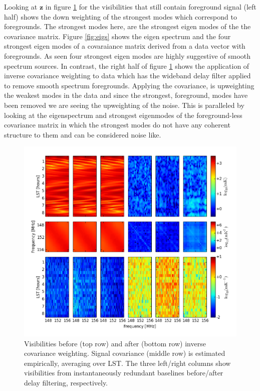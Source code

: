 \documentclass[twocolumn,numberedappendix]{emulateapj} \shorttitle{PSA64}
\begin{document}
Looking at $\mathbf{z}$ in figure \ref{fig:inv_cov} for the visibilities that
still contain foreground signal (left half) shows the down weighting of
the strongest modes which correspond to foregrounds. The strongest modes here,
are the strongest eigen modes of the the covariance matrix. Figure
\ref{fig:eigs} shows the eigen spectrum and the four strongest eigen modes of a
covaraiance matrix derived from a data vector with foregrounds. As seen four
strongest eigen modes are highly suggestive of smooth spectrum sources. In
contrast, the right half of figure \ref{fig:inv_cov} shows the application of
inverse covariance weighting to data which has the wideband delay filter applied
to remove smooth spectrum foregrounds. Applying the covariance, is upweighting
the weakest modes in the data and since the strongest, foreground, modes have
been removed we are seeing the upweighting of the noise. This is paralleled by
looking at the eigenspectrum and strongest eigenmodes of the foreground-less
covariance matrix in which the strongest modes do not have any coherent
structure to them and can be considered noise like.


\begin{figure}[h!]\centering
\includegraphics[width=2\columnwidth]{plots/inv_cov.png}
\caption{
Visibilities before (top row) and after (bottom row) inverse covariance weighting.
Signal covariance (middle row) is estimated empirically, averaging over LST.
The three left/right columns show visibilities from
instantaneously redundant baselines before/after delay filtering, respectively.
} \label{fig:inv_cov}
\end{figure}
\end{document}
